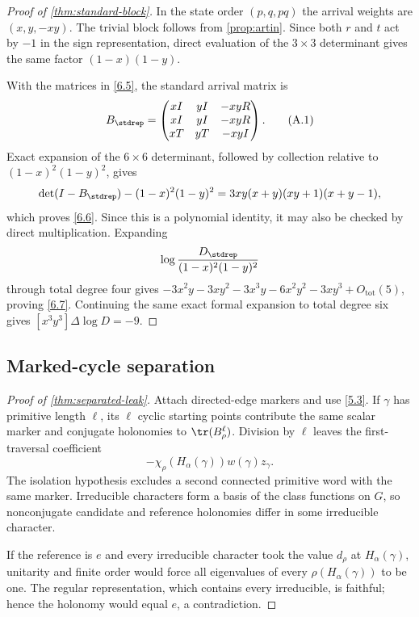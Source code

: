 \begin{proof}[Proof of \cref{thm:standard-block}]
In the state order $(p,q,pq)$ the arrival weights are $(x,y,-xy)$.  The
trivial block follows from \cref{prop:artin}.  Since both $r$ and $t$ act by
$-1$ in the sign representation, direct evaluation of the $3\times3$
determinant gives the same factor $(1-x)(1-y)$.

With the matrices in \eqref{6.5}, the standard arrival matrix is
\[
B_{\stdrep}=
\begin{pmatrix}
xI&yI&-xyR\\
xI&yI&-xyR\\
xT&yT&-xyI
\end{pmatrix}.
\tag{A.1}
\]
Exact expansion of the $6\times6$ determinant, followed by collection
relative to $(1-x)^2(1-y)^2$, gives
\[
\det(I-B_{\stdrep})-(1-x)^2(1-y)^2
=3xy(x+y)(xy+1)(x+y-1),
\]
which proves \eqref{6.6}.  Since this is a polynomial identity, it may also
be checked by direct multiplication.  Expanding
\[
\log\frac{D_{\stdrep}}{(1-x)^2(1-y)^2}
\]
through total degree four gives
$-3x^2y-3xy^2-3x^3y-6x^2y^2-3xy^3+O_{\mathrm{tot}}(5)$, proving
\eqref{6.7}.  Continuing the same exact formal expansion to total degree six
gives $[x^3y^3]\Delta\log D=-9$.
\end{proof}

\subsection{Marked-cycle separation}
\label{app:leak-proof}

\begin{proof}[Proof of \cref{thm:separated-leak}]
Attach directed-edge markers and use \eqref{5.3}.  If $\gamma$ has primitive
length $\ell$, its $\ell$ cyclic starting points contribute the same scalar
marker and conjugate holonomies to $\tr(B_\rho^\ell)$.  Division by $\ell$
leaves the first-traversal coefficient
\[
-\chi_\rho(H_\alpha(\gamma))w(\gamma)z_\gamma.
\]
The isolation hypothesis excludes a second connected primitive word with
the same marker.  Irreducible characters form a basis of the class functions
on $G$, so nonconjugate candidate and reference holonomies differ in some
irreducible character.

If the reference is $e$ and every irreducible character took the value
$d_\rho$ at $H_\alpha(\gamma)$, unitarity and finite order would force all
eigenvalues of every $\rho(H_\alpha(\gamma))$ to be one.  The regular
representation, which contains every irreducible, is faithful; hence the
holonomy would equal $e$, a contradiction.
\end{proof}

